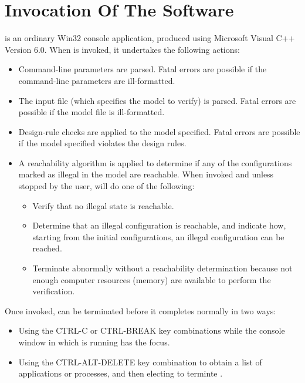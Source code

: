 %
\section{Invocation Of The Software}
\label{sinv0}

\swname{} is an ordinary Win32 console application, produced using Microsoft 
Visual C++ Version 6.0.  When \swname{} is invoked, it undertakes the following actions:

\begin{itemize}
\item {}Command-line 
      parameters are parsed.  Fatal errors are possible if 
      the command-line parameters are ill-formatted.
\item The input file (which specifies the model to verify) is parsed.  
      Fatal errors are possible if the model file is ill-formatted.
\item 
      Design-rule 
      checks are applied to the model specified.
      Fatal errors are possible if the model specified violates the design 
      rules.
\item A reachability algorithm is applied to determine if any of the configurations
      marked as illegal in the model are reachable.  When invoked and
      unless stopped by the user, \swname{} will do 
      one of the following:
      
      \begin{itemize}
      \item Verify that no illegal state is reachable.
      \item Determine that an illegal configuration is reachable, and indicate how, 
            starting from the initial configurations, an illegal configuration can be reached.
      \item Terminate abnormally without a reachability determination because 
            not enough computer resources (memory) are available to perform 
            the verification.
      \end{itemize}
\end{itemize}

Once invoked, \swname{} can be terminated before it completes normally in
two ways:

\begin{itemize}
\item Using the CTRL-C or CTRL-BREAK key combinations while the console
      window in which \swname{} is running has the focus.
\item Using the CTRL-ALT-DELETE key combination to obtain a list of applications
      or processes, and then electing to terminte \swname{}.
\end{itemize}

